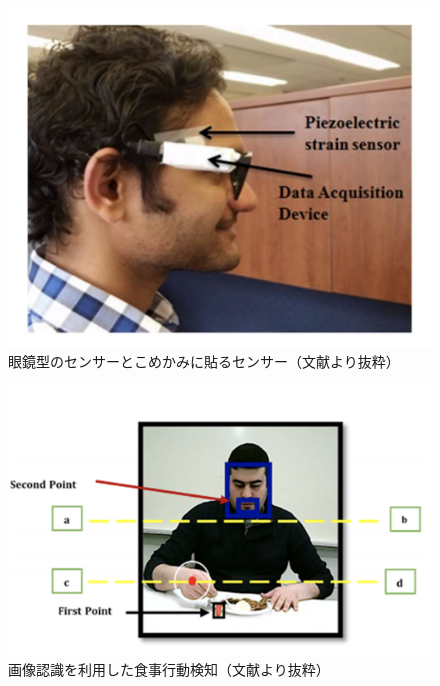 \begin{figure}[htbp]
  \caption{眼鏡型のセンサーとこめかみに貼るセンサー（文献\cite{real_time_eating_wearable_device_eyeglass}より抜粋）}
  \label{fig:real_time_eating_wearable_device_eyeglass}
  \begin{center}
    \includegraphics[bb=0 0 600 400,width=13cm]{assets/fi_monitor_eyeglass.png}
  \end{center}
\end{figure}

\begin{figure}[htbp]
  \caption{画像認識を利用した食事行動検知（文献\cite{vb_fi_monitor_alzheimer}より抜粋）}
  \label{fig:vb_fi_monitor_alzheimer}
  \begin{center}
    \includegraphics[bb=0 0 700 400,width=15cm]{assets/vb_fi_monitor_alzheimer.png}
  \end{center}
\end{figure}

